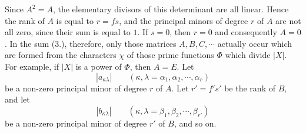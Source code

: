 \documentclass[11pt]{article}
\begin{document}
Since $A^2=A$, the elementary divisors of this determinant are all linear. Hence the rank of $A$ is equal to $r=fs$, and the principal minors of degree $r$ of $A$ are not all zero, since their sum is equal to $1$. If $s=0$, then $r=0$ and consequently $A=0$. In the sum (3.), therefore, only those matrices $A,B,C,\cdots$ actually occur which are formed from the characters $\chi$ of those prime functions $\Phi$ which divide $|X|$. For example, if $|X|$ is a power of $\Phi$, then $A=E$. Let
\begin{equation}\tag{8.}
|a_{\kappa\lambda}|\qquad(\kappa,\lambda=\alpha_1,\alpha_2,\cdots,\alpha_r)
\end{equation}
be a non-zero principal minor of degree $r$ of $A$. Let $r'=f's'$ be the rank of $B$, and let
\[
|b_{\kappa\lambda}|\qquad(\kappa,\lambda=\beta_1,\beta_2,\cdots,\beta_{r'})
\]
be a non-zero principal minor of degree $r'$ of $B$, and so on.
\end{document}
